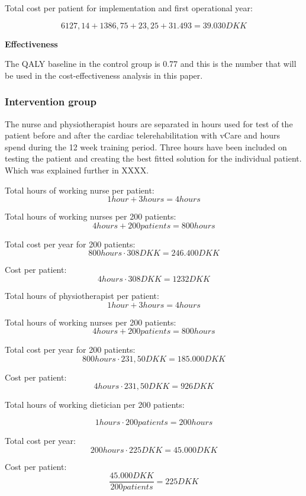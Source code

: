Total cost per patient for implementation and first operational year:

$$6127,14+1386,75+23,25+31.493= 39.030DKK$$


\textbf{Effectiveness}

 The QALY baseline in the control group is 0.77 and this is the number that will be used in the cost-effectiveness analysis in this paper\cite{costeffect}. 

\subsubsection{Intervention group}

The nurse and physiotherapist hours are separated in hours used for test of the patient before and after the cardiac telerehabilitation with vCare and hours spend during the 12 week training period. Three hours have been included on testing the patient and creating the best fitted solution for the individual patient. Which was explained further in XXXX. 

Total hours of working nurse per patient:
$$1hour + 3hours=4hours$$

Total hours of working nurses per 200 patients:
$$4hours + 200patients=800hours$$

Total cost per year for 200 patients:
$$800hours\cdot308DKK= 246.400DKK$$

Cost per patient:
$$4hours \cdot 308DKK=1232DKK$$

Total hours of physiotherapist per patient:
$$1hour + 3hours=4hours$$

Total hours of working nurses per 200 patients:
$$4hours + 200patients=800hours$$

Total cost per year for 200 patients:
$$800hours\cdot231,50DKK= 185.000DKK$$

Cost per patient:
$$4hours \cdot 231,50DKK=926DKK$$

Total hours of working dietician per 200 patients:

$$1hours\cdot200patients=200hours$$

Total cost per year:
$$200hours\cdot225DKK=45.000DKK$$

Cost per patient:
$$\frac{45.000DKK}{200patients}=225DKK$$

